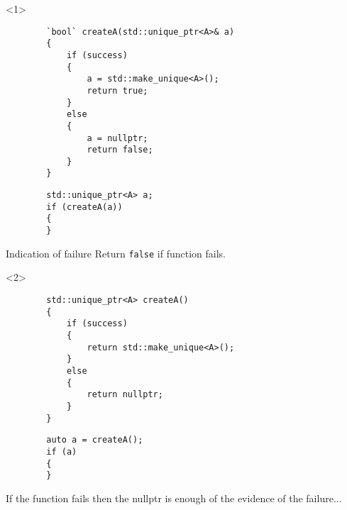 \documentclass{beamer}
\begin{document}
\begin{frame}[fragile,t]
	\begin{onlyenv}
	\begin{lstlisting}
		`bool` createA(std::unique_ptr<A>& a)
		{
			if (success)
			{
				a = std::make_unique<A>();
				return true;
			}
			else
			{
				a = nullptr;
				return false;
			}
		}
	\end{lstlisting}
    \hrulefill
	\begin{lstlisting}
		std::unique_ptr<A> a;
		if (createA(a))
		{
		}
	\end{lstlisting}
	\begin{block}{Indication of failure}
		Return \texttt{false} if function fails.
	\end{block}
	\end{onlyenv}

	\begin{onlyenv}
	\begin{lstlisting}
		std::unique_ptr<A> createA()
		{
			if (success)
			{
				return std::make_unique<A>();
			}
			else
			{
				return nullptr;
			}
		}
	\end{lstlisting}

    \hrulefill
	\begin{lstlisting}
		auto a = createA();
		if (a)
		{
		}	
	\end{lstlisting}
	\begin{block}{}
		If the function fails then the nullptr is enough of the evidence of the failure...	
	\end{block}
	\end{onlyenv}
\end{frame}
\end{document}
